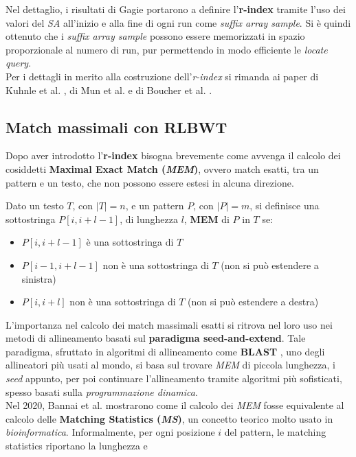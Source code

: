 Nel dettaglio, i risultati di Gagie portarono a definire l'\textbf{r-index}
tramite l'uso dei valori del \textit{SA} all'inizio e alla fine di ogni run come
\textit{suffix array sample}. Si è quindi ottenuto che i \textit{suffix array
  sample} possono essere memorizzati in spazio proporzionale al numero di run,
pur permettendo in modo efficiente le \textit{locate query}.\\
Per i dettagli in merito alla costruzione dell'\textit{r-index} si rimanda ai
paper di Kuhnle et al. \cite{kuhnle}, di Mun et al. \cite{mun} e di Boucher et
al. \cite{boucher}. 
\subsection{Match massimali con RLBWT}
Dopo aver introdotto l'\textbf{r-index} bisogna brevemente come avvenga il
calcolo dei cosiddetti \textbf{Maximal Exact Match
  (\textit{MEM})}, ovvero match esatti, tra un pattern e un testo, che non
possono essere estesi in alcuna direzione.
\begin{definizione}
  Dato un testo $T$, con $|T|=n$, e un pattern $P$, con $|P|=m$, si definisce
  una sottostringa $P[i,i+l-1]$, di lunghezza $l$, \textbf{MEM} di $P$ in $T$
  se:
  \begin{itemize}
    \item $P[i,i+l-1]$ è una sottostringa di $T$
    \item $P[i-1,i+l-1]$ non è una sottostringa di $T$ (non si può estendere a
    sinistra) 
    \item $P[i,i+l]$ non è una sottostringa di $T$ (non si può estendere a
    destra) 
  \end{itemize}
\end{definizione}
L'importanza nel calcolo dei match massimali esatti si ritrova nel loro uso nei
metodi di allineamento basati sul \textbf{paradigma seed-and-extend}.
Tale paradigma, sfruttato in algoritmi di allineamento come \textbf{BLAST}
\cite{blast}, uno degli allineatori più usati al mondo, si basa sul trovare
\textit{MEM} di piccola lunghezza, i \textit{seed} appunto, per poi continuare
l'allineamento tramite algoritmi più sofisticati, spesso basati sulla
\textit{programmazione dinamica}. \\
Nel 2020, Bannai et al. \cite{bannai} mostrarono come il calcolo dei
\textit{MEM} fosse equivalente al calcolo delle \textbf{Matching Statistics
  (\textit{MS})}, un concetto teorico molto usato in
\textit{bioinformatica}. Informalmente, per ogni posizione $i$ del pattern, le
matching statistics riportano la lunghezza e 
